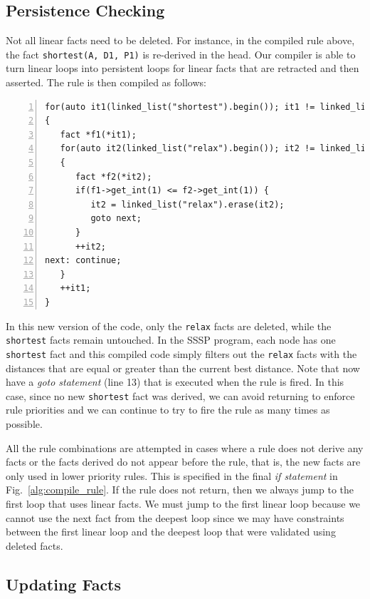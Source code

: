 \subsection{Persistence Checking}

Not all linear facts need to be deleted. For instance, in the compiled rule
above, the fact \texttt{shortest(A, D1, P1)} is re-derived in the head. Our
compiler is able to turn linear loops into persistent loops for linear facts
that are retracted and then asserted.  The rule is then compiled as follows:

\begin{Verbatim}[numbers=left,fontsize=\scriptsize]
for(auto it1(linked_list("shortest").begin()); it1 != linked_list("shortest").end(); )
{
   fact *f1(*it1);
   for(auto it2(linked_list("relax").begin()); it2 != linked_list("relax").end(); )
   {
      fact *f2(*it2);
      if(f1->get_int(1) <= f2->get_int(1)) {
         it2 = linked_list("relax").erase(it2);
         goto next;
      }
      ++it2;
next: continue;
   }
   ++it1;
}
\end{Verbatim}

In this new version of the code, only the \texttt{relax} facts are deleted,
   while the \texttt{shortest} facts remain untouched. In the SSSP program, each
   node has one \texttt{shortest} fact and this compiled code simply filters out
   the \texttt{relax} facts with the distances that are equal or greater than
   the current best distance. Note that now have a \emph{goto statement} (line
         13) that is executed when the rule is fired.  In this case, since no
   new \texttt{shortest} fact was derived, we can avoid returning to enforce
   rule priorities and we can continue to try to fire the rule as many times as
   possible.

All the rule combinations are attempted in cases where a rule does not derive
any facts or the facts derived do not appear before the rule, that is, the new
facts are only used in lower priority rules. This is specified in the final
\emph{if statement} in Fig.~\ref{alg:compile_rule}. If the rule does not return,
then we always jump to the first loop that uses linear facts. We must jump to
the first linear loop because we cannot use
the next fact from the deepest loop since we may have constraints between the
first linear loop and the deepest loop that were validated using deleted facts.

\subsection{Updating Facts}


